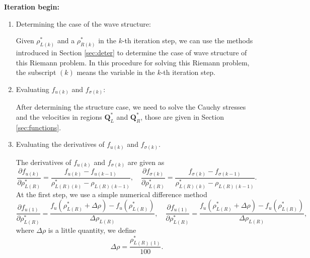 \documentclass{article}
\numberwithin{equation}{section}
\numberwithin{table}{section}
\begin{document}
\noindent
\textbf{Iteration begin:}
\begin{enumerate}[Step 1]
  \item Determining the case of the wave structure:

	Given $\rho _{L(k)}^*$ and a  $\rho _{R(k)}^*$ in the $k$-th  iteration step, we can use the methods introduced in Section \ref{sec:deter} to determine the case of wave structure of this Riemann problem. In this procedure for solving this Riemann problem, the subscript $(k)$ means the variable in the $k$-th  iteration step.

  \item Evaluating $f_{u(k)}$ and $f_{\sigma(k)}$:

  After determining the structure case, we need  to solve the Cauchy stresses and the velocities in regions $\mathbf{Q}^*_L$ and $\mathbf{Q}^*_R$, those are given in Section \ref{sec:functions}.

  \item Evaluating the derivatives of $f_{u(k)}$ and $f_{\sigma(k)}$.

The derivatives of $f_{u(k)}$ and $f_{\sigma(k)}$ are given as
\begin{equation}
  \frac{\partial f_{u(k)}}{\partial \rho^*_{L(R)}} = \frac{f_{u(k)}-f_{u(k-1)}}{\rho_{L(R)(k)}^* - \rho_{L(R)(k-1)}},\quad
  \frac{\partial f_{\sigma(k)}}{\partial \rho^*_{L(R)}} = \frac{f_{\sigma(k)}-f_{\sigma(k-1)}}{\rho_{L(R)(k)}^* - \rho_{L(R)(k-1)}}.
\end{equation}
At the first step, we use a simple  numerical difference  method
\begin{equation}
  \frac{\partial f_{u(1)}}{\partial \rho^*_{L(R)}} = \frac{f_{u}(\rho^*_{L(R)}+\Delta \rho)-f_{u}(\rho^*_{L(R)})}{\Delta \rho_{L(R)}},\quad
  \frac{\partial f_{u(1)}}{\partial \rho^*_{L(R)}} = \frac{f_{u}(\rho^*_{L(R)}+\Delta \rho)-f_{u}(\rho^*_{L(R)})}{\Delta \rho_{L(R)}},
\end{equation}
where $\Delta \rho$ is a little quantity, we define
\begin{equation}
  \Delta \rho = \frac{\rho_{L(R)(1)}^*}{100}.
\end{equation}


\end{enumerate}
\end{document}

